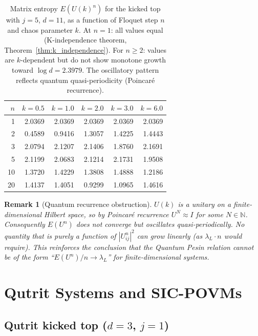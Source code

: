 \documentclass[12pt,a4paper]{article}
\newtheorem{remark}[theorem]{Remark}
\begin{document}
\begin{table}[h]\centering
\begin{tabular}{r|rrrrr}
\hline
$n$ & $k=0.5$ & $k=1.0$ & $k=2.0$ & $k=3.0$ & $k=6.0$ \\
\hline
1  & 2.0369 & 2.0369 & 2.0369 & 2.0369 & 2.0369 \\
2  & 0.4589 & 0.9416 & 1.3057 & 1.4225 & 1.4443 \\
3  & 2.0794 & 2.1207 & 2.1406 & 1.8760 & 2.1691 \\
5  & 2.1199 & 2.0683 & 2.1214 & 2.1731 & 1.9508 \\
10 & 1.3720 & 1.4229 & 1.3808 & 1.4888 & 1.2186 \\
20 & 1.4137 & 1.4051 & 0.9299 & 1.0965 & 1.4616 \\
\hline
\end{tabular}
\caption{Matrix entropy $E(U(k)^n)$ for the kicked top with $j=5$, $d=11$,
as a function of Floquet step $n$ and chaos parameter $k$.
At $n=1$: all values equal (K-independence theorem, Theorem~\ref{thm:k_independence}).
For $n\geq 2$: values are $k$-dependent but do not show monotone growth toward $\log d = 2.3979$.
The oscillatory pattern reflects quantum quasi-periodicity (Poincaré recurrence).}
\label{tab:E_Un_j5}
\end{table}

\begin{remark}[Quantum recurrence obstruction]
$U(k)$ is a unitary on a \emph{finite}-dimensional Hilbert space, so by Poincaré
recurrence $U^N \approx I$ for some $N \in \mathbb{N}$.  Consequently
$E(U^n)$ does not converge but oscillates quasi-periodically.  No quantity that
is purely a function of $|U^n_{ij}|^2$ can grow linearly (as $\lambda_L \cdot n$
would require).  This reinforces the conclusion that \emph{the Quantum Pesin
relation cannot be of the form ``$E(U^n)/n \to \lambda_L$''} for finite-dimensional
systems.
\end{remark}

\section{Qutrit Systems and SIC-POVMs}
\label{sec:qutrit}

\subsection{Qutrit kicked top ($d=3$, $j=1$)}
\end{document}
